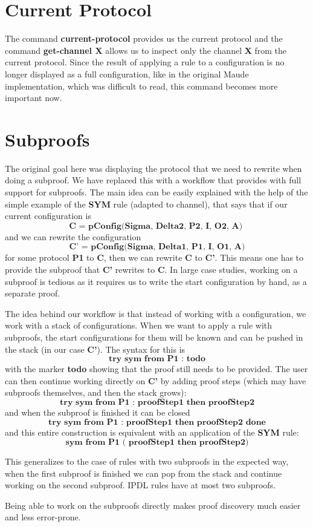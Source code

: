 \documentclass{article}
\begin{document}
\section{Current Protocol}

The command \textbf{current-protocol} provides us the 
current protocol and the command \textbf{get-channel X} allows us to 
inspect only the channel \textbf{X} from the current protocol.
Since the result of applying a rule to a 
configuration is no longer displayed as a full
configuration, like in the original Maude implementation,
which was difficult to read,
this command becomes more important now.
 
\section{Subproofs}

The original goal here was displaying the protocol that we
need to rewrite when doing a subproof.
We have replaced this with a workflow that
provides with full support for subproofs.
The main idea can be easily explained with the help of the simple
example of the \textbf{SYM} rule (adapted to channel), that says that
if our current configuration is 
$$\textbf{C =  pConfig(Sigma, Delta2, P2, I, O2, A) }$$ and we can rewrite the configuration 
$$\textbf{C' = pConfig(Sigma, Delta1, P1, I, O1, A)}$$ \noindent for some protocol \textbf{P1} to \textbf{C},
then we can rewrite \textbf{C} to \textbf{C'}.
This means one has to provide the subproof that \textbf{C'} rewrites
to \textbf{C}. In large case studies, working on a subproof is tedious as 
it requires us to write the start configuration by hand, as a separate proof. 

The idea behind our workflow
is that instead of working with a configuration, we work with a stack of
configurations. When we want to apply a rule with subproofs, the start
configurations for them will be known and can be pushed in the stack (in our case \textbf{C'}). 
The syntax for this is 
$$\textbf{try sym from P1 : todo}$$ 
\noindent with the marker \textbf{todo} showing that
the proof still needs to be provided. 
The user can then continue working directly on
\textbf{C'} by adding proof steps (which may have subproofs themselves, and then the stack grows):
$$ \textbf{try sym from P1 : proofStep1 then proofStep2} $$
\noindent
and when the subproof is finished it can be closed
$$
\textbf{try sym from P1 : proofStep1 then proofStep2 done}
$$\noindent
and this entire construction is equivalent with
an application of the \textbf{SYM} rule:
$$
\textbf{sym from P1 ( proofStep1 then proofStep2)}
$$

This generalizes to the case of rules with two subproofs in the expected way, when the first subproof is finished we can pop from the stack and
continue working on the second subproof. IPDL rules have at most two subproofs. 

Being able to work on the subproofs directly makes proof discovery much 
easier and less error-prone.
\end{document}
